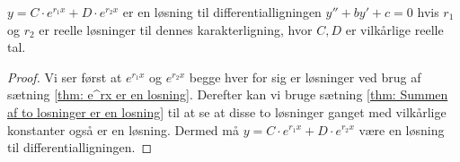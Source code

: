 \begin{thm}
$y = C \cdot e^{r_1 x} + D \cdot e^{r_2 x}$ er en løsning til differentialligningen $y'' + by' + c = 0$ hvis $r_1$ og $r_2$ er reelle løsninger til dennes karakterligning, hvor $C,D$ er vilkårlige reelle tal.
\end{thm}
\begin{proof}
Vi ser først at $e^{r_1 x}$ og $e^{r_2 x}$ begge hver for sig er løsninger ved brug af sætning \ref{thm: e^rx er en losning}.
Derefter kan vi bruge sætning \ref{thm: Summen af to losninger er en losning} til at se at disse to løsninger ganget med vilkårlige konstanter også er en løsning.
Dermed må $y = C \cdot e^{r_1 x} + D \cdot e^{r_2 x}$ være en løsning til differentialligningen. 
\end{proof}